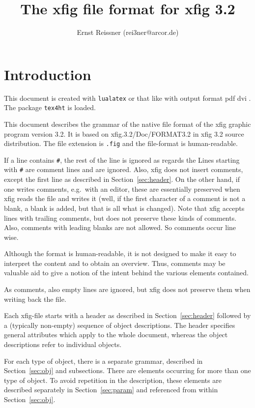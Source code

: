 \documentclass[10pt, a4paper]{article}
\title{The xfig file format for xfig 3.2 }
\author{Ernst Reissner (rei3ner@arcor.de)}
\date{}
\begin{document}
\maketitle
\tableofcontents

\section{Introduction}

This document is created with \texttt{lualatex} or that like 
with output format 
\ifpdf%
pdf%
\else
dvi%
\fi.
The package \texttt{tex4ht} 
is  loaded. 

This document describes the grammar 
of the native file format of the xfig graphic program version 3.2. 
It is based on xfig.3.2/Doc/FORMAT3.2 in xfig 3.2 source distribution. 
The file extension is \texttt{.fig} and the file-format is human-readable. 

If a line contains \texttt{\#}, 
the rest of the line is ignored as regards the 
Lines starting with \texttt{\#} are comment lines and are ignored. 
Also, xfig does not insert comments, 
except the first line as described in Section~\ref{sec:header}. 
On the other hand, if one writes comments, e.g.~with an editor, 
these are essentially preserved when xfig reads the file and writes it 
(well, if the first character of a comment is not a blank, 
a blank is added, but that is all what is changed). 
Note that xfig accepts lines with trailing comments, 
but does not preserve these kinds of comments. 
Also, comments with leading blanks are not allowed. 
So comments occur line wise. 

Although the format is human-readable, 
it is not designed to make it easy to interpret the content 
and to obtain an overview. 
Thus, comments may be valuable aid to give a notion 
of the intent behind the various elements contained. 

As comments, also empty lines are ignored, 
but xfig does not preserve them when writing back the file. 

Each xfig-file starts with a header as described in Section~\ref{sec:header} 
followed by a (typically non-empty) sequence of object descriptions. 
The header specifies general attributes which apply to the whole document, 
whereas the object descriptions refer to individual objects. 

For each type of object, there is a separate grammar, 
described in Section~\ref{sec:obj} and subsections. 
There are elements occurring for more than one type of object. 
To avoid repetition in the description, 
these elements are described separately in Section~\ref{sec:param} 
and referenced from within Section~\ref{sec:obj}. 
\end{document}
